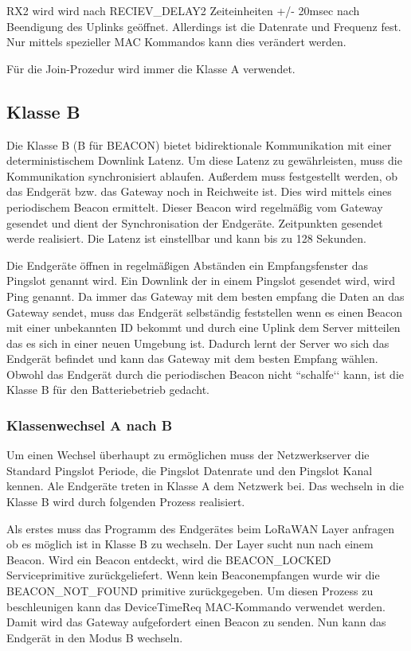 \documentclass[a4paper,12pt]{article}
\begin{document}
            RX2 wird wird nach RECIEV\_DELAY2 Zeiteinheiten +/- 20msec nach Beendigung des Uplinks geöffnet. Allerdings
            ist die Datenrate und Frequenz fest. Nur mittels spezieller MAC Kommandos kann dies verändert werden.
            
            Für die Join-Prozedur wird immer die Klasse A verwendet.
        \subsection{Klasse B}
            Die Klasse B (B für BEACON) bietet bidirektionale Kommunikation mit einer deterministischem Downlink Latenz.
            Um diese Latenz zu gewährleisten, muss die Kommunikation synchronisiert ablaufen. Außerdem muss 
            festgestellt werden, ob das Endgerät bzw. das Gateway noch in Reichweite ist. Dies wird mittels eines 
            periodischem Beacon ermittelt. Dieser Beacon wird regelmäßig vom Gateway gesendet und dient der 
            Synchronisation der Endgeräte. Zeitpunkten gesendet werde realisiert. Die Latenz ist einstellbar und kann 
            bis zu 128 Sekunden.\cite[S.66 ff.]{LoRaSpec}

            Die Endgeräte öffnen in regelmäßigen Abständen ein Empfangsfenster das Pingslot genannt wird. Ein Downlink 
            der in einem Pingslot gesendet wird, wird Ping genannt. Da immer das Gateway mit dem besten empfang die 
            Daten an das Gateway sendet, muss das Endgerät selbständig feststellen wenn es einen Beacon mit einer 
            unbekannten ID bekommt und durch eine Uplink dem Server mitteilen das es sich in einer neuen Umgebung ist. 
            Dadurch lernt der Server wo sich das Endgerät befindet und kann das Gateway mit dem besten Empfang wählen.
            Obwohl das Endgerät durch die periodischen Beacon nicht ``schalfe‘‘ kann, ist die Klasse B für den 
            Batteriebetrieb gedacht.

            \subsubsection{Klassenwechsel A nach B}
                Um einen Wechsel überhaupt zu ermöglichen muss der Netzwerkserver die Standard Pingslot Periode, die 
                Pingslot Datenrate und den Pingslot Kanal kennen. Ale Endgeräte treten in Klasse A dem Netzwerk bei. 
                Das wechseln in die Klasse B wird durch folgenden Prozess realisiert.

                Als erstes muss das Programm des Endgerätes beim LoRaWAN Layer anfragen ob es möglich ist in Klasse B 
                zu wechseln. Der Layer sucht nun nach einem Beacon. Wird ein Beacon entdeckt, wird die BEACON\_LOCKED 
                Serviceprimitive  zurückgeliefert. Wenn kein Beaconempfangen wurde wir die 
                BEACON\_NOT\_FOUND primitive zurückgegeben. Um diesen Prozess zu beschleunigen kann das DeviceTimeReq 
                MAC-Kommando verwendet werden. Damit wird das Gateway aufgefordert einen Beacon zu senden. Nun kann 
                das Endgerät in den Modus B wechseln.
\end{document}
